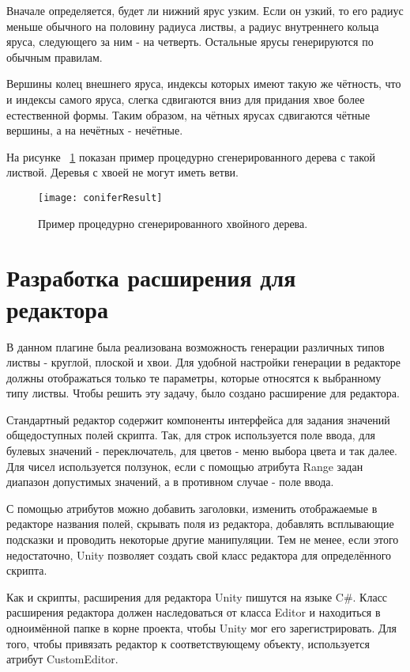Вначале определяется, будет ли нижний ярус узким. Если он узкий, то его радиус меньше обычного на половину радиуса листвы, а радиус внутреннего кольца яруса, следующего за ним - на четверть. Остальные ярусы генерируются по обычным правилам.

Вершины колец внешнего яруса, индексы которых имеют такую же чётность, что и индексы самого яруса, слегка сдвигаются вниз для придания хвое более естественной формы. Таким образом, на чётных ярусах сдвигаются чётные вершины, а на нечётных - нечётные. 

На рисунке ~\ref{fig:coniferResult} показан пример процедурно сгенерированного дерева с такой листвой. Деревья с хвоей не могут иметь ветви.

\begin{figure}[!htb]
    \centering
    \texttt{[image: coniferResult]}
    \caption{Пример процедурно сгенерированного хвойного дерева.}
    \label{fig:coniferResult}
\end{figure}

\section{Разработка расширения для редактора}
В данном плагине была реализована возможность генерации различных типов листвы - круглой, плоской и хвои. Для удобной настройки генерации в редакторе должны отображаться только те параметры, которые относятся к выбранному типу листвы. Чтобы решить эту задачу, было создано расширение для редактора.

Стандартный редактор содержит компоненты интерфейса для задания значений общедоступных полей скрипта. Так, для строк используется поле ввода, для булевых значений - переключатель, для цветов - меню выбора цвета и так далее. Для чисел используется ползунок, если с помощью атрибута Range задан диапазон допустимых значений, а в противном случае - поле ввода. 

С помощью атрибутов можно добавить заголовки, изменить отображаемые в редакторе названия полей, скрывать поля из редактора, добавлять всплывающие подсказки и проводить некоторые другие манипуляции. Тем не менее, если этого недостаточно, Unity позволяет создать свой класс редактора для определённого скрипта.

Как и скрипты, расширения для редактора Unity пишутся на языке C\#. Класс расширения редактора должен наследоваться от класса Editor и находиться в одноимённой папке в корне проекта, чтобы Unity мог его зарегистрировать. Для того, чтобы привязать редактор к соответствующему объекту, используется атрибут CustomEditor\cite{UnityEditor}.

